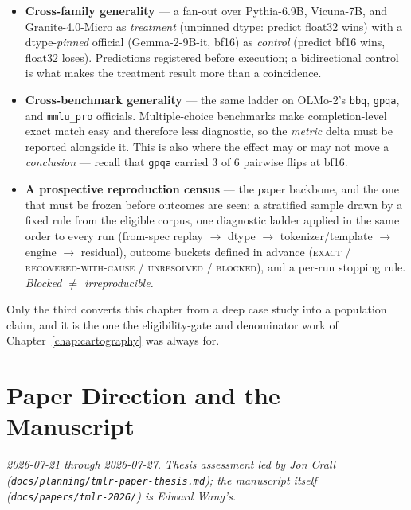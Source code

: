 \documentclass[11pt]{report}
\newcommand{\code}[1]{\texttt{#1}}
\newcommand{\file}[1]{\texttt{#1}}
\begin{document}
\begin{itemize}[nosep]
  \item \textbf{Cross-family generality} --- a fan-out over Pythia-6.9B, Vicuna-7B,
        and Granite-4.0-Micro as \emph{treatment} (unpinned dtype: predict float32
        wins) with a dtype-\emph{pinned} official (Gemma-2-9B-it, bf16) as
        \emph{control} (predict bf16 wins, float32 loses). Predictions registered
        before execution; a bidirectional control is what makes the treatment
        result more than a coincidence.
  \item \textbf{Cross-benchmark generality} --- the same ladder on OLMo-2's
        \code{bbq}, \code{gpqa}, and \code{mmlu\_pro} officials. Multiple-choice
        benchmarks make completion-level exact match easy and therefore less
        diagnostic, so the \emph{metric} delta must be reported alongside it. This
        is also where the effect may or may not move a \emph{conclusion} --- recall
        that \code{gpqa} carried 3 of 6 pairwise flips at bf16.
  \item \textbf{A prospective reproduction census} --- the paper backbone, and the
        one that must be frozen before outcomes are seen: a stratified sample drawn
        by a fixed rule from the eligible corpus, one diagnostic ladder applied in
        the same order to every run (from-spec replay $\rightarrow$ dtype
        $\rightarrow$ tokenizer/template $\rightarrow$ engine $\rightarrow$
        residual), outcome buckets defined in advance (\textsc{exact} /
        \textsc{recovered-with-cause} / \textsc{unresolved} / \textsc{blocked}), and
        a per-run stopping rule. \emph{Blocked $\neq$ irreproducible.}
\end{itemize}

Only the third converts this chapter from a deep case study into a population claim,
and it is the one the eligibility-gate and denominator work of
Chapter~\ref{chap:cartography} was always for.

\chapter{Paper Direction and the Manuscript}
\label{chap:paperdirection}

\emph{2026-07-21 through 2026-07-27. Thesis assessment led by Jon Crall
(\file{docs/planning/tmlr-paper-thesis.md}); the manuscript itself
(\file{docs/papers/tmlr-2026/}) is Edward Wang's.}
\end{document}
